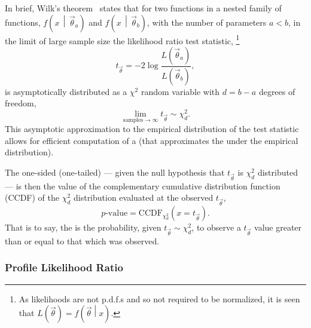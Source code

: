 In brief, Wilk's theorem~\cite{Wilks:1938dza} states that for two functions in a nested family of functions, $f\left(x\,\middle|\,\vec{\theta}_{a}\right)$ and $f\left(x\,\middle|\,\vec{\theta}_{b}\right)$, with the number of parameters $a < b$, in the limit of large sample size the likelihood ratio test statistic,%
\footnote{As likelihoods are not p.d.f.s and so not required to be normalized, it is seen that $L\left(\vec{\theta}\right) = f\left(\vec{\theta}\middle|x\right)$.}
\begin{equation}
 t_{\vec{\theta}} = -2 \log \frac{\displaystyle L\left(\vec{\theta}_{a}\right)}{\displaystyle L\left(\vec{\theta}_{b}\right)},
\end{equation}
is asymptotically distributed as a $\chi^2$ random variable with $d=b-a$ degrees of freedom,
\begin{equation}
 \lim_{\mathrm{samples}\to \infty} t_{\vec{\theta}} \sim \chi^2_{d}.\label{eq:wilks_theorem}
\end{equation}
This asymptotic approximation to the empirical distribution of the test statistic allows for efficient computation of a \pvalue{} (that approximates the \pvalue{} under the empirical distribution).

The one-sided (one-tailed) \pvalue{} --- given the null hypothesis that $t_{\vec{\theta}}$ is $\chi_{d}^{2}$ distributed --- is then the value of the complementary cumulative distribution function (CCDF) of the $\chi^2_{d}$ distribution evaluated at the observed $t_{\vec{\theta}}$,
\begin{equation}
 p\textrm{-value} = \textrm{CCDF}_{\chi^2_{d}}\left(x=t_{\vec{\theta}}\right).
\end{equation}
That is to say, the \pvalue{} is the probability, given $t_{\vec{\theta}} \sim \chi^2_{d}$, to observe a $t_{\vec{\theta}}$ value greater than or equal to that which was observed.

\subsubsection{Profile Likelihood Ratio}

